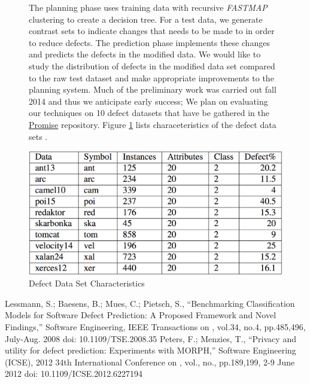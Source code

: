 \documentclass[10pt]{article}
\begin{document}
\begin{figure}[h!]
\begin{minipage}{0.5\textwidth}
The planning phase uses training data with recursive 
\textit{FASTMAP} 
clustering to create a decision tree. For a test data, we generate contrast 
sets 
to indicate changes that needs to be made to in order to reduce defects. The 
prediction phase implements these changes and predicts the defects in the 
modified data. We would like to study the distribution of defects in the 
modified 
data set compared to the raw test dataset and make appropriate improvements to 
the planning system. Much of the preliminary work was carried out fall 2014 and 
thus we anticipate early success; We plan on evaluating our techniques on 10 
defect datasets that have be gathered in the 
\href{https://github.com/rahlk/Research/tree/master/Defects/Data}{Promise} 
repository. Figure \ref{fig2} lists characeteristics of the defect data sets 
\cite{fayola}.\\[-1cm]
\end{minipage} \hspace{0.01\linewidth}
\begin{minipage}{0.5\textwidth}
	\centering
	\includegraphics[width = \linewidth]{datasets}
	\caption{Defect Data Set Characteristics}
	\label{fig2}
\end{minipage}
\end{figure}
\begin{thebibliography}{10}
Lessmann, S.; Baesens, B.; Mues, C.; Pietsch, S., ``Benchmarking Classification 
Models for Software Defect Prediction: A Proposed Framework and Novel 
Findings,'' Software Engineering, IEEE Transactions on , vol.34, no.4, 
pp.485,496, July-Aug. 2008
doi: 10.1109/TSE.2008.35
Peters, F.; Menzies, T., ``Privacy and utility for defect prediction: 
Experiments with MORPH,'' Software Engineering (ICSE), 2012 34th International 
Conference on , vol., no., pp.189,199, 2-9 June 2012
doi: 10.1109/ICSE.2012.6227194
\end{thebibliography}
\end{document}
